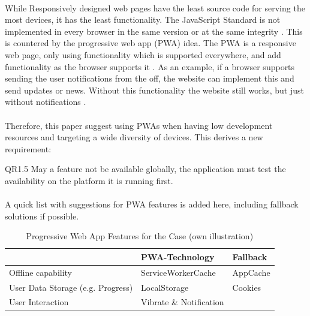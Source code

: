 \paragraph{} While Responsively designed web pages have the least source code for serving the most devices, it has the least functionality. The JavaScript Standard is not implemented in every browser in the same version or at the same integrity \parencite[cf.][]{Zaytsev.2017}. This is countered by the progressive web app (PWA) idea. The PWA is a responsive web page, only using functionality which is supported everywhere, and add functionality as the browser supports it \parencite[cf.][]{GoogleDevelopers.}. As an example, if a browser supports sending the user notifications from the off, the website can implement this and send updates or news. Without this functionality the website still works, but just without notifications \parencite[cf.][]{Vaiyapuri.25.05.2015}. 

\paragraph{} Therefore, this paper suggest using PWAs when having low development resources and targeting a wide diversity of devices. This derives a new requirement:
\begin{closeItem}
      \item [QR1.5] May a feature not be available globally, the application must test the availability on the platform it is running first.
\end{closeItem}

\paragraph{} A quick list with suggestions for PWA features is added here, including fallback solutions if possible.
\begin{table}[H]
    \centering
    \begin{tabular}{m{5.33cm}|m{5.33cm}|m{5.33cm}}
    &   PWA-Technology &   Fallback    \\
    \hline 
Offline capability  &	ServiceWorkerCache   &   AppCache    \\
    \hline 
User Data Storage (e.g. Progress)	&   LocalStorage    &   Cookies    \\
    \hline 
User Interaction	&   Vibrate \& Notification  & ~~~  \\
    \end{tabular}
    \caption[Progressive Web App Features for the Case]{Progressive Web App Features for the Case (own illustration)}
    \label{tab:my_label}
\end{table}


